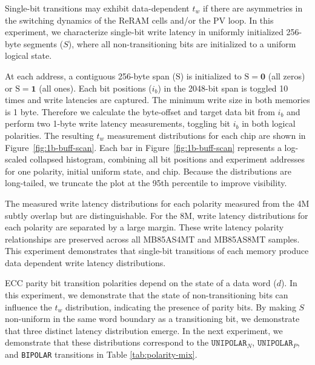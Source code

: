 \label{exp:ii}
Single-bit transitions may exhibit data-dependent $t_w$ if there are asymmetries in the switching dynamics of the ReRAM cells and/or the PV loop. In this experiment, we characterize single-bit write latency in uniformly initialized 256-byte segments ($S$), where all non-transitioning bits are initialized to a uniform logical state.

% 


At each address, a contiguous 256-byte span ($\mathrm{S}$) is initialized to $\mathrm{S}=\mathbf{0}$ (all zeros)  or $\mathrm{S}=\mathbf{1}$  (all ones). Each bit positions ($i_b$) in the 2048-bit span is toggled 10 times and write latencies are captured. The minimum write size in both memories is 1 byte. Therefore we calculate the byte-offset and target data bit from $i_b$ and perform two 1-byte write latency measurements, toggling bit $i_b$ in both logical polarities.
The resulting $t_w$ measurement distributions for each chip are shown in Figure~\ref{fig:1b-buff-scan}.
Each bar in Figure~\ref{fig:1b-buff-scan} represents a log-scaled collapsed histogram, combining all bit positions and experiment addresses for one polarity, initial uniform state, and chip. 
Because the distributions are long-tailed, we truncate the plot at the 95th percentile to improve visibility.

The measured write latency distributions for each polarity measured from the 4M subtly overlap but are distinguishable. For the 8M, write latency distributions for each polarity are separated by a large margin. These write latency polarity relationships are preserved across all MB85AS4MT and MB85AS8MT samples. This experiment demonstrates that single-bit transitions of each memory produce data dependent write latency distributions.

\label{exp:iii}

% 


ECC parity bit transition polarities depend on the state of a data word ($d$). In this experiment, we demonstrate that the state of non-transitioning bits can influence the $t_w$ distribution, indicating the presence of parity bits. By making $S$ non-uniform in the same word boundary as a transitioning bit, we demonstrate that three distinct latency distribution emerge. In the next experiment, we demonstrate that these distributions correspond to the $\texttt{UNIPOLAR}_N$, $\texttt{UNIPOLAR}_P$, and \texttt{BIPOLAR} transitions in Table \ref{tab:polarity-mix}.

